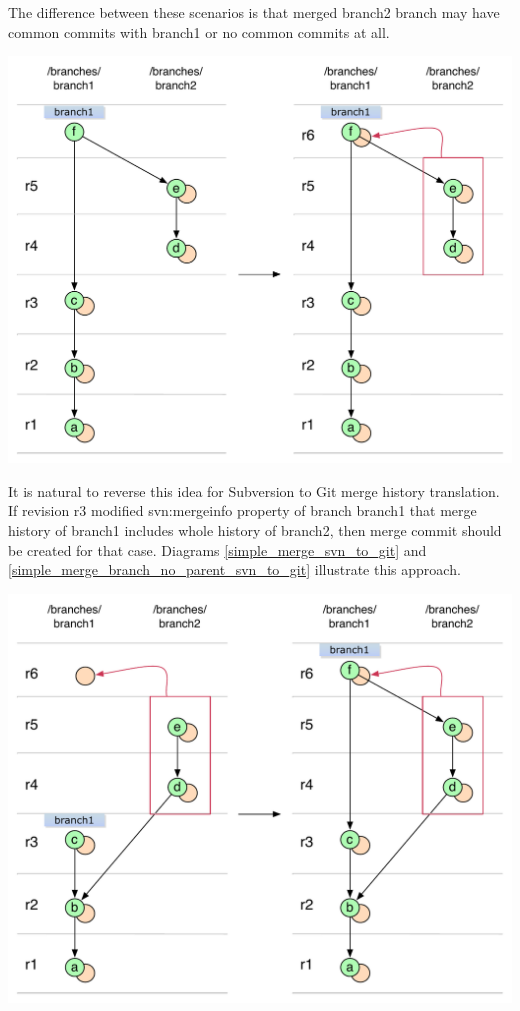 The difference between these scenarios is that merged branch2 branch may have common commits with branch1 or no common commits at all.

\begin{center}
\includegraphics[width=\textwidth]{img/diagrams/simple_merge_branch_no_parent_git_to_svn.pdf}%
\label{simple_merge_branch_no_parent_git_to_svn}%
\end{center}

It is natural to reverse this idea for Subversion to Git merge history translation. If revision r3 modified svn:mergeinfo property of branch branch1 that merge history of branch1 includes whole history of branch2, then merge commit should be created for that case. Diagrams \ref{simple_merge_svn_to_git} and \ref{simple_merge_branch_no_parent_svn_to_git} illustrate this approach.

\begin{center}
\includegraphics[width=\textwidth]{img/diagrams/simple_merge_svn_to_git.pdf}%
\label{simple_merge_svn_to_git}%
\end{center}

